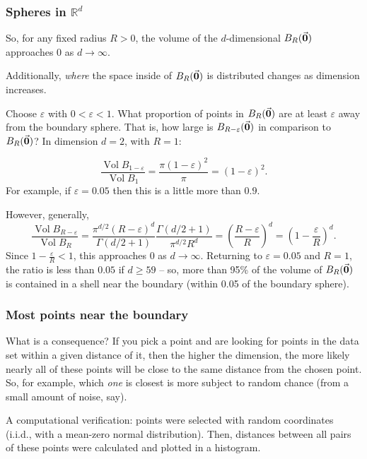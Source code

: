 \documentclass[smaller]{beamer}
\theoremstyle{example}
\begin{document}
\begin{frame}
    \frametitle{Spheres in $\mathbb R^d$}
    So, for any fixed radius $R>0$, the volume of the $d$-dimensional $B_R(\vec{\bf 0})$ approaches $0$ as $d\to\infty$.  

    Additionally, \textit{where} the space inside of $B_R(\vec{\bf 0})$ is distributed changes as dimension increases. 

    Choose $\varepsilon$ with $0 < \varepsilon < 1$. What proportion of points in $B_R(\vec{\bf 0})$ are at least $\varepsilon$ away from the boundary sphere. That is, how large is $B_{R-\varepsilon}(\vec{\bf 0})$ in comparison to $B_{R}(\vec{\bf 0})$? In dimension $d=2$, with $R=1$:

    \[\frac{\operatorname{Vol}B_{1-\varepsilon}}{\operatorname{Vol}B_{1}} = 
    \frac{\pi(1-\varepsilon)^2}{\pi} = (1-\varepsilon)^2.
    \]
    For example, if $\varepsilon =0.05$ then this is a little more than $0.9$.

    However, generally, 
    \[\frac{\operatorname{Vol}B_{R-\varepsilon}}{\operatorname{Vol}B_{R}} = 
    \frac{\pi^{d/2}(R-\varepsilon)^d}{\Gamma(d/2 + 1)}\frac{\Gamma(d/2+1)}{\pi^{d/2}R^d} = \left(\frac{R-\varepsilon}{R}\right)^d = \left(1 - \frac{\varepsilon}{R}\right)^d.
    \]
    Since $1-\frac{\varepsilon}{R} < 1$, this approaches $0$ as $d\to\infty$. Returning to $\varepsilon=0.05$ and $R=1$, the ratio is less than $0.05$ if $d \ge 59$ {--} so, more than 95\% of the volume of $B_{R}(\vec{\bf 0})$ is contained in a shell near the boundary (within 0.05 of the boundary sphere).
\end{frame}

\begin{frame}
    \frametitle{Most points near the boundary}
    What is a consequence? If you pick a point and are looking for points in the data set within a given distance of it, then the higher the dimension, the more likely nearly all of these points will be close to the same distance from the chosen point. So, for example, which \textit{one} is closest is more subject to random chance (from a small amount of noise, say). 

    A computational verification: points were selected with random coordinates (i.i.d., with a mean-zero normal distribution). Then, distances between all pairs of these points were calculated and plotted in a histogram. 

    \centering
\end{frame}
\end{document}
